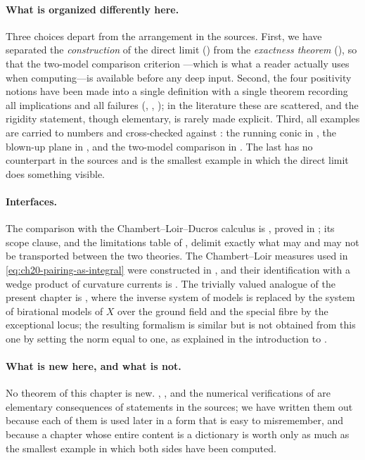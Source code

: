 \paragraph{What is organized differently here.}
Three choices depart from the arrangement in the sources.  First, we have
separated the \emph{construction} of the direct limit
() from the \emph{exactness
theorem} (), so that the two-model comparison
criterion ---which is what a reader
actually uses when computing---is available before any deep input.  Second,
the four positivity notions have been made into a single definition with a
single theorem recording all implications and all failures
(,
,
); in the literature these are
scattered, and the rigidity statement, though elementary, is rarely made
explicit.  Third, all examples are carried to numbers and cross-checked
against : the running conic in
, the blown-up plane in
, and the two-model
comparison in .  The last has no counterpart
in the sources and is the smallest example in which the direct limit does
something visible.

\paragraph{Interfaces.}
The comparison with the Chambert--Loir--Ducros calculus is
, proved in
; its scope clause, and the limitations table of
, delimit exactly what may and may not be
transported between the two theories.  The Chambert--Loir measures used in
\eqref{eq:ch20-pairing-as-integral} were constructed in
, and their identification with a wedge product
of curvature currents is
.  The trivially valued analogue of the present
chapter is , where the inverse system of models is
replaced by the system of birational models of $X$ over the ground field
and the special fibre by the exceptional locus; the resulting formalism is
similar but is not obtained from this one by setting the norm equal to one,
as explained in the introduction to .

\paragraph{What is new here, and what is not.}
No theorem of this chapter is new.  ,
,  and the
numerical verifications of  are elementary
consequences of statements in the sources; we have written them out because
each of them is used later in a form that is easy to misremember, and
because a chapter whose entire content is a dictionary is worth only as much
as the smallest example in which both sides have been computed.
